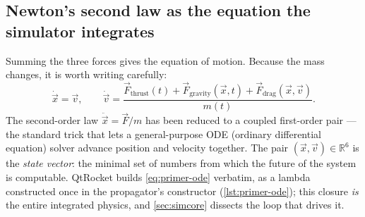 
\subsection{Newton's second law as the equation the simulator integrates}%
\label{sec:primer-ode}

Summing the three forces gives the equation of motion. Because the mass changes, it is worth
writing carefully:
\begin{equation}
  \dot{\vec x} = \vec v, \qquad
  \dot{\vec v} = \frac{\vec F_{\text{thrust}}(t) + \vec F_{\text{gravity}}(\vec x, t)
                      + \vec F_{\text{drag}}(\vec x, \vec v)}{m(t)} .
  \label{eq:primer-ode}
\end{equation}
The second-order law $\ddot{\vec x} = \vec F/m$ has been reduced to a coupled first-order
pair --- the standard trick that lets a general-purpose ODE (ordinary differential equation)
solver advance position and velocity together. The pair
$(\vec x, \vec v) \in \mathbb{R}^6$ is the \emph{state vector}: the minimal set of numbers
from which the future of the system is computable. QtRocket builds
\cref{eq:primer-ode} verbatim, as a lambda constructed once in the propagator's constructor
(\cref{lst:primer-ode}); this closure \emph{is} the entire integrated physics, and
\cref{sec:simcore} dissects the loop that drives it.

